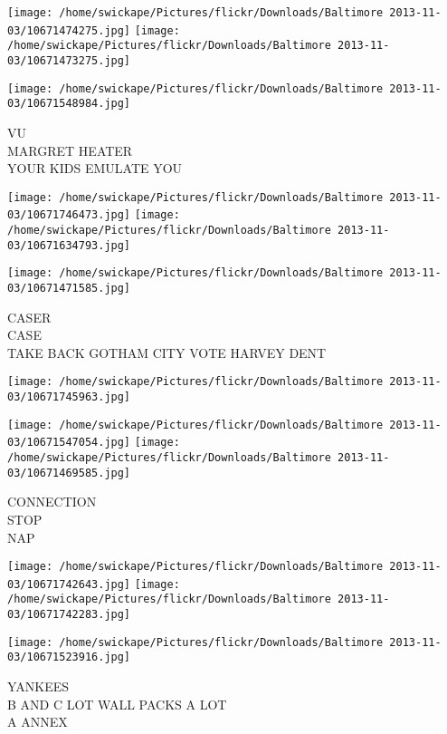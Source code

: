 \documentclass[10pt,letterpaper]{article}
\begin{document}
\texttt{[image: /home/swickape/Pictures/flickr/Downloads/Baltimore 2013-11-03/10671474275.jpg]}
\texttt{[image: /home/swickape/Pictures/flickr/Downloads/Baltimore 2013-11-03/10671473275.jpg]}

\vspace{0.25in}
\texttt{[image: /home/swickape/Pictures/flickr/Downloads/Baltimore 2013-11-03/10671548984.jpg]}

VU\\
MARGRET HEATER\\
YOUR KIDS EMULATE YOU\\
\pagebreak

\texttt{[image: /home/swickape/Pictures/flickr/Downloads/Baltimore 2013-11-03/10671746473.jpg]}
\texttt{[image: /home/swickape/Pictures/flickr/Downloads/Baltimore 2013-11-03/10671634793.jpg]}

\texttt{[image: /home/swickape/Pictures/flickr/Downloads/Baltimore 2013-11-03/10671471585.jpg]}

CASER\\
CASE\\
TAKE BACK GOTHAM CITY VOTE HARVEY DENT\\
\pagebreak

\texttt{[image: /home/swickape/Pictures/flickr/Downloads/Baltimore 2013-11-03/10671745963.jpg]}

\vspace{0.25in}
\texttt{[image: /home/swickape/Pictures/flickr/Downloads/Baltimore 2013-11-03/10671547054.jpg]}
\texttt{[image: /home/swickape/Pictures/flickr/Downloads/Baltimore 2013-11-03/10671469585.jpg]}

CONNECTION\\
STOP\\
NAP\\
\pagebreak

\texttt{[image: /home/swickape/Pictures/flickr/Downloads/Baltimore 2013-11-03/10671742643.jpg]}
\texttt{[image: /home/swickape/Pictures/flickr/Downloads/Baltimore 2013-11-03/10671742283.jpg]}

\texttt{[image: /home/swickape/Pictures/flickr/Downloads/Baltimore 2013-11-03/10671523916.jpg]}

YANKEES\\
B AND C LOT WALL PACKS A LOT\\
A ANNEX\\
\pagebreak
\end{document}
